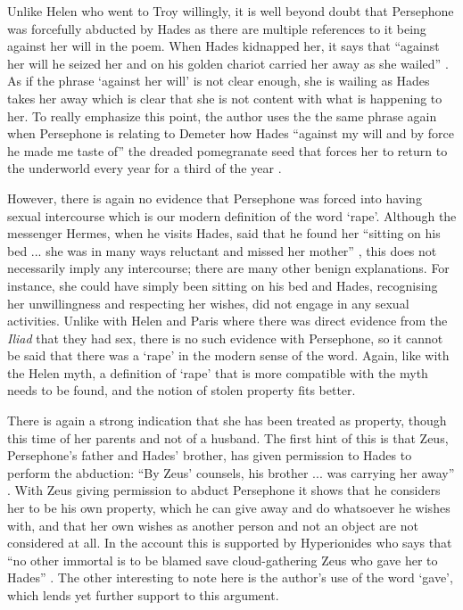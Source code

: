 \documentclass[11pt]{article}
\begin{document}
Unlike Helen who went to Troy willingly, it is well beyond doubt that Persephone was forcefully abducted by Hades as there are multiple references to it being against her will in the poem.
When Hades kidnapped her, it says that ``against her will he seized her and on his golden chariot carried her away as she wailed'' \cite[line 19]{persephone}.
As if the phrase `against her will' is not clear enough, she is wailing as Hades takes her away which is clear that she is not content with what is happening to her.
To really emphasize this point, the author uses the the same phrase again when Persephone is relating to Demeter how Hades ``against my will and by force he made me taste of'' the dreaded pomegranate seed that forces her to return to the underworld every year for a third of the year \cite[line 412]{persephone}.

However, there is again no evidence that Persephone was forced into having sexual intercourse which is our modern definition of the word `rape'.
Although the messenger Hermes, when he visits Hades, said that he found her ``sitting on his bed ... she was in many ways reluctant and missed her mother'' \cite[line 344]{persephone}, this does not necessarily imply any intercourse; there are many other benign explanations.
For instance, she could have simply been sitting on his bed and Hades, recognising her unwillingness and respecting her wishes, did not engage in any sexual activities.
Unlike with Helen and Paris where there was direct evidence from the \emph{Iliad} that they had sex, there is no such evidence with Persephone, so it cannot be said that there was a `rape' in the modern sense of the word.
Again, like with the Helen myth, a definition of `rape' that is more compatible with the myth needs to be found, and the notion of stolen property fits better.

There is again a strong indication that she has been treated as property, though this time of her parents and not of a husband.
The first hint of this is that Zeus, Persephone's father and Hades' brother, has given permission to Hades to perform the abduction: ``By Zeus' counsels, his brother ... was carrying her away'' \cite[line 30]{persephone}.
With Zeus giving permission to abduct Persephone it shows that he considers her to be his own property, which he can give away and do whatsoever he wishes with, and that her own wishes as another person and not an object are not considered at all.
In the account this is supported by Hyperionides who says that ``no other immortal is to be blamed save cloud-gathering Zeus who gave her to Hades'' \cite[line 78]{persephone}.
The other interesting to note here is the author's use of the word `gave', which lends yet further support to this argument.
\end{document}
